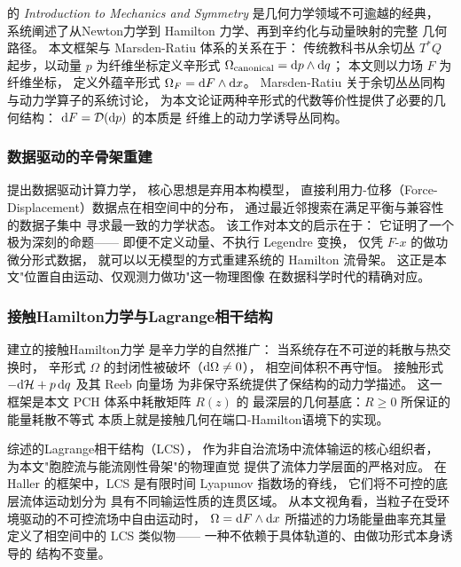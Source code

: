 ﻿\documentclass[10pt,a4paper]{article}
\begin{document}
\textcite{MarsdenRatiu1994} 的 \emph{Introduction to Mechanics and Symmetry}
是几何力学领域不可逾越的经典，
系统阐述了从Newton力学到 Hamilton 力学、再到辛约化与动量映射的完整
几何路径。
本文框架与 Marsden-Ratiu 体系的关系在于：
传统教科书从余切丛 $T^*Q$ 起步，以动量 $p$ 为纤维坐标定义辛形式
$\Omega_{\text{canonical}} = \text dp \wedge \text dq$；
本文则以力场 $F$ 为纤维坐标，
定义外蕴辛形式 $\Omega_F = \text dF \wedge \text dx$。
Marsden-Ratiu 关于余切丛丛同构与动力学算子的系统讨论，
为本文论证两种辛形式的代数等价性提供了必要的几何结构：
$\text dF = \mathcal D(\text dp)$ 的本质是
纤维上的动力学诱导丛同构。

\subsubsection{数据驱动的辛骨架重建}

\textcite{KirchdoerferOrtiz2016} 提出数据驱动计算力学，
核心思想是弃用本构模型，
直接利用力-位移（Force-Displacement）数据点在相空间中的分布，
通过最近邻搜索在满足平衡与兼容性的数据子集中
寻求最一致的力学状态。
该工作对本文的启示在于：
它证明了一个极为深刻的命题——
即便不定义动量、不执行 Legendre 变换，
仅凭 $F\text{-}x$ 的做功微分形式数据，
就可以以无模型的方式重建系统的 Hamilton 流骨架。
这正是本文"位置自由运动、仅观测力做功"这一物理图像
在数据科学时代的精确对应。

\subsubsection{接触Hamilton力学与Lagrange相干结构}

\textcite{BravettiCruzTapias2017} 建立的接触Hamilton力学
是辛力学的自然推广：
当系统存在不可逆的耗散与热交换时，
辛形式 $\Omega$ 的封闭性被破坏（$\text d\Omega \neq 0$），
相空间体积不再守恒。
接触形式 $-\text d\mathcal H + p\,\text dq$ 及其 Reeb 向量场
为非保守系统提供了保结构的动力学描述。
这一框架是本文 PCH 体系中耗散矩阵 $R(z)$ 的
最深层的几何基底：$R \ge 0$ 所保证的能量耗散不等式
本质上就是接触几何在端口-Hamilton语境下的实现。

\textcite{Haller2015} 综述的Lagrange相干结构（LCS），
作为非自治流场中流体输运的核心组织者，
为本文"胞腔流与能流刚性骨架"的物理直觉
提供了流体力学层面的严格对应。
在 Haller 的框架中，LCS 是有限时间 Lyapunov 指数场的脊线，
它们将不可控的底层流体运动划分为
具有不同输运性质的连贯区域。
从本文视角看，当粒子在受环境驱动的不可控流场中自由运动时，
$\Omega = \text dF \wedge \text dx$ 所描述的力场能量曲率充其量
定义了相空间中的 LCS 类似物——
一种不依赖于具体轨道的、由做功形式本身诱导的
结构不变量。
\end{document}
